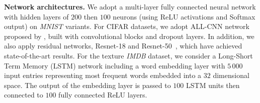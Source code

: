 \documentclass[twoside]{article}
\begin{document}
\textbf{Network architectures.} We adopt a multi-layer fully connected neural network with hidden layers of $200$ then $100$ neurons (using \textrm{ReLU} activations and \textrm{Softmax} output) on \textit{MNIST} variants. 
For CIFAR datasets, we adopt ALL-CNN network proposed by \citep{CNN15}, built with convolutional blocks and dropout layers.
 In addition, we also apply residual networks, Resnet-18 and Resnet-50~\citep{Rnet16}, which have achieved state-of-the-art results.
For the texture \textit{IMDB} dataset, we consider a Long-Short Term Memory (LSTM) network \citep{gers1999learning} including a word embedding layer with $5\,000$ input entries representing most frequent words embedded into a $32$ dimensional space. 
The output of the embedding layer is passed to $100$ LSTM units then connected to $100$ fully connected \textrm{ReLU} layers. 
\end{document}
